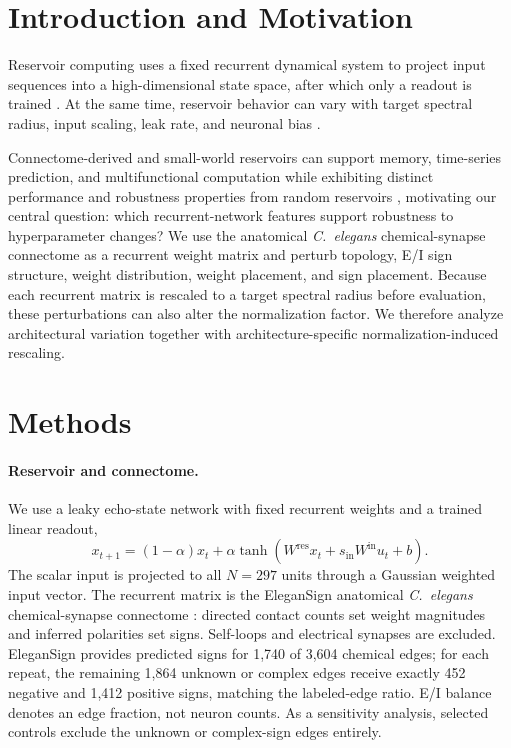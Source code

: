 \documentclass[mlabstract,onecolumn]{jmlr}
\begin{document}
\section{Introduction and Motivation}

Reservoir computing uses a fixed recurrent dynamical system to project input sequences into a high-dimensional state space, after which only a readout is trained \citep{jaeger_echo_state_2001,maass_lsm_2002}. At the same time, reservoir behavior can vary with target spectral radius, input scaling, leak rate, and neuronal bias \citep{Lukosevicius2012PracticalESN,Matzner2022HyperparameterTuningESN}. 

Connectome-derived and small-world reservoirs can support memory, time-series prediction, and multifunctional computation while exhibiting distinct performance and robustness properties from random reservoirs \citep{KAWAI201915,morra_daley_2022,morra_fly_rc_2023}, motivating our central question: which recurrent-network features support robustness to hyperparameter changes? We use the anatomical \textit{C.~elegans} chemical-synapse connectome as a recurrent weight matrix and perturb topology, E/I sign structure, weight distribution, weight placement, and sign placement. Because each recurrent matrix is rescaled to a target spectral radius before evaluation, these perturbations can also alter the normalization factor. We therefore analyze architectural variation together with architecture-specific normalization-induced rescaling.

\section{Methods}
\paragraph{Reservoir and connectome.}
We use a leaky echo-state network with fixed recurrent weights and a trained linear readout,
\begin{equation}
x_{t+1}=(1-\alpha)x_t+\alpha\tanh\!\left(W^{\mathrm{res}}x_t+s_{\mathrm{in}}W^{\mathrm{in}}u_t+b\right).
\label{eq:state}
\end{equation}
The scalar input is projected to all $N=297$ units through a Gaussian weighted input vector. The recurrent matrix is the EleganSign anatomical \textit{C.~elegans} chemical-synapse connectome \citep{fenyves_szilagyi_2020}: directed contact counts set weight magnitudes and inferred polarities set signs. Self-loops and electrical synapses are excluded. EleganSign provides predicted signs for 1,740 of 3,604 chemical edges; for each repeat, the remaining 1,864 unknown or complex edges receive exactly 452 negative and 1,412 positive signs, matching the labeled-edge ratio. E/I balance denotes an edge fraction, not neuron counts. As a sensitivity analysis, selected controls exclude the unknown or complex-sign edges entirely.
\end{document}
